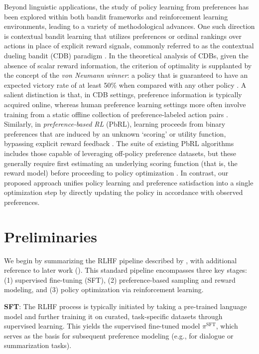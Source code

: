 Beyond linguistic applications, the study of policy learning from preferences has been explored within both bandit frameworks and reinforcement learning environments, leading to a variety of methodological advances. One such direction is contextual bandit learning that utilizes preferences or ordinal rankings over actions in place of explicit reward signals, commonly referred to as the contextual dueling bandit (CDB) paradigm \citep{yue2012karmed, dudik2015contextual}. In the theoretical analysis of CDBs, given the absence of scalar reward information, the criterion of optimality is supplanted by the concept of the \textit{von Neumann winner}: a policy that is guaranteed to have an expected victory rate of at least 50\% when compared with any other policy \citep{dudik2015contextual}. A salient distinction is that, in CDB settings, preference information is typically acquired online, whereas human preference learning settings more often involve training from a static offline collection of preference-labeled action pairs \citep{yan2022human}. Similarly, in \textit{preference-based RL} (PbRL), learning proceeds from binary preferences that are induced by an unknown ‘scoring’ or utility function, bypassing explicit reward feedback \citep{BusaFekete2014, ruiz2023dueling}. The suite of existing PbRL algorithms includes those capable of leveraging off-policy preference datasets, but these generally require first estimating an underlying scoring function (that is, the reward model) before proceeding to policy optimization \citep{jain2013learning, BusaFekete2014, christiano2017deep, sadigh2017active, kupcsik2018learning}. In contrast, our proposed approach unifies policy learning and preference satisfaction into a single optimization step by directly updating the policy in accordance with observed preferences.

\section{Preliminaries}\label{section:prelims}

We begin by summarizing the RLHF pipeline described by \citeauthor{ziegler2020finetuning}, with additional reference to later work (\citep{stiennon2022learning, bai2022training, ouyang2022training}). This standard pipeline encompasses three key stages: (1) supervised fine-tuning (SFT), (2) preference-based sampling and reward modeling, and (3) policy optimization via reinforcement learning.

\textbf{SFT}: The RLHF process is typically initiated by taking a pre-trained language model and further training it on curated, task-specific datasets through supervised learning. This yields the supervised fine-tuned model $\pi^\text{SFT}$, which serves as the basis for subsequent preference modeling (e.g., for dialogue or summarization tasks).

